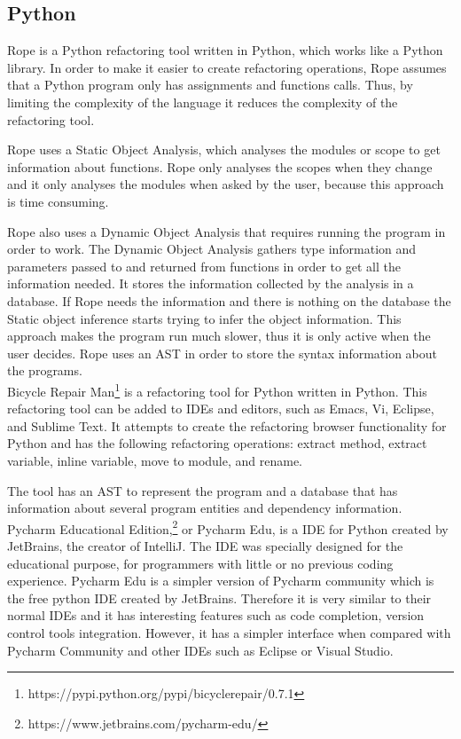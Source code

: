 \subsection{Python}

Rope\cite[p.~109]{govindaraj2015test} is a Python refactoring tool written in Python, which works like a Python library.
In order to make it easier to create refactoring operations, Rope assumes that a
Python program only has assignments and functions calls. %
Thus, by limiting the complexity of the language it reduces the complexity of the
refactoring tool.

Rope uses a Static Object Analysis, which analyses the modules or scope to get
information about functions.
Rope only analyses the scopes when they change and it only analyses the modules
when asked by the user, because this approach is time consuming.

Rope also uses a Dynamic Object Analysis that requires running
the program in order to work.
The Dynamic Object Analysis gathers type information and parameters passed to and returned from
functions in order to get all the information needed.
It stores the information collected by the analysis in a database.
If Rope needs the information and there is nothing on the database the Static
object inference starts trying to infer the object information.
This approach makes the program run much slower, thus it is only active when
the user decides. %
Rope uses an AST in order to store the syntax information about the programs. \\

Bicycle Repair Man\footnote{https://pypi.python.org/pypi/bicyclerepair/0.7.1} is a refactoring tool for Python written in Python.
 This refactoring tool can be added to IDEs and editors, such as Emacs, Vi, Eclipse,
  and Sublime Text.
It attempts to create the refactoring browser functionality for
 Python and has the following refactoring operations:
 extract method, extract variable, inline variable, move to module, and rename.

The tool has an AST to represent the program and a database that has information
about several program entities and dependency information. \\


Pycharm Educational Edition,\footnote{https://www.jetbrains.com/pycharm-edu/}
 or Pycharm Edu, is a IDE for Python created by JetBrains,
the creator of IntelliJ.
The IDE was specially designed for the educational purpose, for programmers
with little or no previous coding experience.
Pycharm Edu is a simpler version of Pycharm community which is the free
python IDE created by JetBrains.
Therefore it is very similar to their normal IDEs and it has interesting features
such as code completion, version control tools integration.
However, it has a simpler interface when compared with
Pycharm Community and other IDEs such as Eclipse or Visual Studio. %

